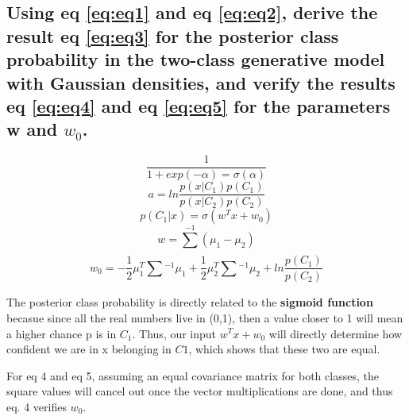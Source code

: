\documentclass{article}
\begin{document}
	\subsection{Using eq \ref{eq:eq1} and eq \ref{eq:eq2}, derive the result eq \ref{eq:eq3} for the posterior class
		probability in the two-class generative model with Gaussian densities, and verify the
		results eq \ref{eq:eq4} and eq \ref{eq:eq5} for the parameters w and $w_{0}$.}
		\begin{equation}
			\label{eq:eq1}
			\frac{1}{1 + exp(-\alpha) = \sigma(\alpha)}
		\end{equation}
		\begin{equation}
			\label{eq:eq2}
			a = ln\frac{p(x|C_{1})p(C_{1})}{p(x|C_{2})p(C_{2})}	
		\end{equation}
		\begin{equation}
			\label{eq:eq3}
			p(C_{1}|x) = \sigma(w^{T}x + w_{0})
		\end{equation}
		\begin{equation}
			\label{eq:eq4}
			w = \sum_{}^{-1}(\mu_{1} - \mu_{2})
		\end{equation}
		\begin{equation}
			\label{eq:eq5}
				w_{0} = -\frac{1}{2}\mu^{T}_{1}\sum_{}^{}^{-1}\mu_{1} + \frac{1}{2}\mu_{2}^{T}\sum_{}^{}^{-1}\mu_{2} + ln\frac{p(C_{1})}{p(C_{2})}
		\end{equation}

		The posterior class probability is directly related to the \textbf{sigmoid function} becasue since 
		all the real numbers live in (0,1), then a value closer to 1 will mean a higher chance p is in $C_{1}$. 
		Thus, our input $w^{T}x + w_{0}$ will directly determine how confident we are in x belonging in $C{1}$,
		which shows that these two are equal.

		For eq 4 and eq 5, assuming an equal covariance matrix for both classes, the square values will
		cancel out once the vector multiplications are done, and thus eq. 4 verifies $ w_{0}$. 
		
\end{document}
